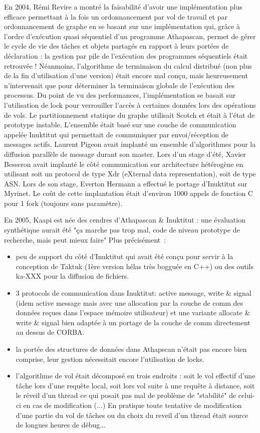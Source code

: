 \documentclass[12pt]{report}
\begin{document}
En 2004, Rémi Revire a montré la faisabilité d'avoir une implémentation plus efficace permettant à la fois un ordonnancement par vol de travail et par ordonnancement de graphe en se basant sur une implémentation qui, grâce à l'ordre d'exécution quasi séquentiel d'un programme Athapascan, permet de gérer le cycle de vie des tâches et objets partagés en rapport à leurs portées de déclaration : la gestion par pile de l'exécution des programmes séquentiels était retrouvée ! Néanmoins, l'algorithme de terminaison du calcul distribué (non plus de la fin d'utilisation d'une version) était encore mal conçu, mais heureusement n'intervenait que pour déterminer la terminaison globale de l'exécution des processus.
Du point de vu des performances, l'implémentation se basait sur l'utilisation de lock pour verrouiller l'accès à certaines données lors des opérations de vols. Le partitionnement statique du graphe utilisait Scotch et était à l'état de prototype instable. L'ensemble était basé sur une couche de communication appelée Inuktitut qui permettait de communiquer par envoi/réception de messages actifs. 
Laurent Pigeon avait implanté un ensemble d'algorithmes pour la diffusion parallèle de message durant son master.
Lors d'un stage d'été, Xavier Besseron avait implanté le côté communication sur architecture hétérogène en utilisant soit un protocol de type Xdr (eXternal data representation), soit de type ASN.
Lors de son stage, Everton Hermann a effectué le portage d'Inuktitut sur Myrinet.
Le coût de cette implantation était d'environ 1000 appels de fonction C pour 1 fork (toujours sans paramètre).

En 2005, Kaapi est née des cendres d'Athapascan \& Inuktitut : une évaluation synthétique aurait été "ça marche pas trop mal, code de niveau prototype de recherche, mais peut mieux faire"
Plus précisément~:
\begin{itemize}
\item peu de support du côté d'Inuktitut qui avait été conçu pour servir à la conception de Taktuk (1ère version hélas très bogguée en C++) ou des outils ka-XXX pour la diffusion de fichiers.
\item 3 protocols de communication dans Inuktitut: active message, write \& signal (idem active message mais avec une allocation par la couche de comm des données reçues dans l'espace mémoire utilisateur) et une variante allocate \& write \& signal bien adaptée à un portage de la couche de comm directement au dessus de CORBA.
\item la portée des structures de données dans Athapscan n'était pas encore bien comprise, leur gestion nécessitait encore l'utilisation de locks.
\item l'algorithme de vol était décomposé en trois endroits : soit le vol effectif d'une tâche lors d'une requête local, soit lors vol suite à une requête à distance, soit le réveil d'un thread ce qui posait pas mal de problème de "stabilité" de celui-ci en cas de modification (...) En pratique toute tentative de modification d'une partie du vol de tâches ou du choix du reveil d'un thread était source de longues heures de débug...
\end{itemize}
\end{document}
